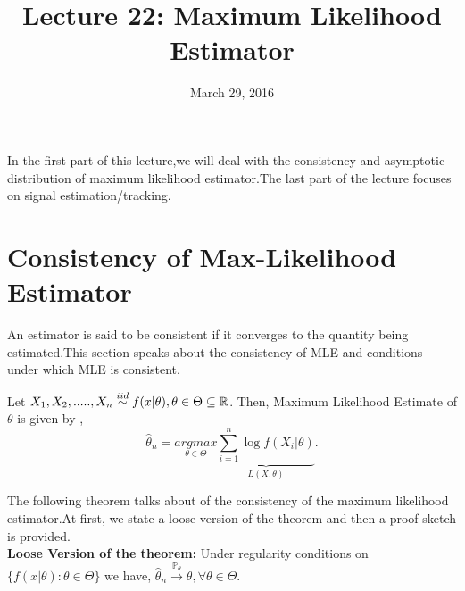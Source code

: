 \documentclass[a4paper,english,12pt]{article}
\title{Lecture 22: Maximum Likelihood Estimator}
\date{March 29, 2016}
\author{}
\begin{document}
\maketitle
\maketitle
\par In the first part of this lecture,we will deal with the consistency and asymptotic distribution of maximum likelihood estimator.The last part of the lecture focuses on signal estimation/tracking.
\section{Consistency of Max-Likelihood Estimator}
 \par An estimator is said to be consistent if it converges to the quantity being estimated.This section speaks about the consistency of MLE  and conditions under which MLE is consistent.
 \par  Let $X_1,X_2,.....,X_n \overset{iid}{\sim } f(x|\theta), \theta \in \Theta \subseteq  \mathbb{R}$. Then,  Maximum Likelihood Estimate of $\theta$ is given by ,  
\begin{equation}
  \hat{\theta}_n=\underset{\theta \in \Theta}{arg max}\underbrace{\sum_{i=1}^{n}\log{f(X_i|\theta)}}_{L(X,\theta)}.
\end{equation}
\par The following theorem talks about of the consistency of the maximum likelihood estimator.At first, we state a loose version of the theorem and then a proof sketch is provided.\\
\textbf{Loose Version of the theorem:}  Under regularity conditions on $ \{ f(x|\theta): \theta \in \Theta \}$ we have,
$\hat{\theta}_n \xrightarrow{\mathbb{P}_\theta} \theta  ,\forall \theta \in \Theta$.
\end{document}
